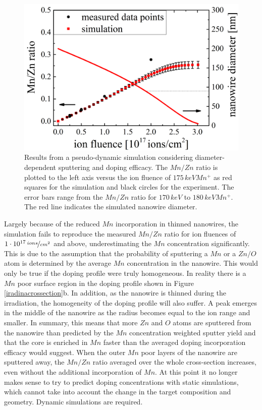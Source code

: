 \begin{figure}[h]
	\centering
		\includegraphics[width=.7\textwidth]{images/pseudodynamic.png}
	\caption{Results from a pseudo-dynamic simulation considering diameter-dependent sputtering and doping efficacy. The $Mn/Zn$ ratio is plotted to the left axis versus the ion fluence of $175\,keV Mn^+$ as red squares for the simulation and black circles for the experiment. The error bars range from the $Mn/Zn$ ratio for $170\,keV$ to $180\,keV Mn^+$. The red line indicates the simulated nanowire diameter.}
	\label{pseudodynamic}
\end{figure} 


Largely because of the reduced $Mn$ incorporation in thinned nanowires, the simulation fails to reproduce the measured $Mn/Zn$ ratio for ion fluences of $1\cdot 10^{17}\,\nicefrac{ions}{cm^2}$ and above, underestimating the $Mn$ concentration significantly. This is due to the assumption that the probability of sputtering a $Mn$ or a $Zn/O$ atom is determined by the average $Mn$ concentration in the nanowire. This would only be true if the doping profile were truly homogeneous. In reality there is a $Mn$ poor surface region in the doping profile shown in Figure \ref{iradinacrossection}b. In addition, as the nanowire is thinned during the irradiation, the homogeneity of the doping profile will also suffer. A peak emerges in the middle of the nanowire as the radius becomes equal to the ion range and smaller. In summary, this means that more $Zn$ and $O$ atoms are sputtered from the nanowire than predicted by the $Mn$ concentration weighted sputter yield and that the core is enriched in $Mn$ faster than the averaged doping incorporation efficacy would suggest. When the outer $Mn$ poor layers of the nanowire are sputtered away, the $Mn/Zn$ ratio averaged over the whole cross-section increases, even without the additional incorporation of $Mn$. At this point it no longer makes sense to try to predict doping concentrations with static simulations, which cannot take into account the change in the target composition and geometry. Dynamic simulations are required.
 

